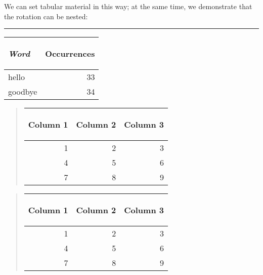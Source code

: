 \documentclass[twoside]{article}
\begin{document}
We can set tabular material in this way; at the same time, we
demonstrate that the rotation can be nested:
\begin{example}
\begin{sideways}
\rule{1in}{0pt}
\begin{tabular}{|lr|}
\em Word & \begin{rotate}{90}%
Occurrences\end{rotate}
\\
\hline
hello & 33\\
goodbye & 34\\
\hline
\end{tabular}
\end{sideways}
\end{example}

\begin{example}
\begin{quote}
\rule{0pt}{1.5in}\begin{tabular}{rrr}
\begin{rotate}{45}Column 1\end{rotate}&
\begin{rotate}{45}Column 2\end{rotate}&
\begin{rotate}{45}Column 3\end{rotate}\\
\hline
1& 2& 3\\
4& 5& 6\\
7& 8& 9\\
\hline
\end{tabular}
\end{quote}
\end{example}

\begin{example}
\begin{quote}
\begin{tabular}{rrr}
\begin{turn}{45}Column 1\end{turn}&
\begin{turn}{45}Column 2\end{turn}&
\begin{turn}{45}Column 3\end{turn}\\
\hline
1& 2& 3\\
4& 5& 6\\
7& 8& 9\\
\hline
\end{tabular}
\end{quote}
\end{example}
\end{document}
